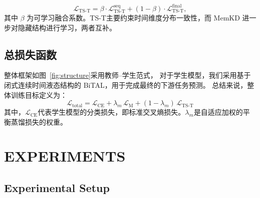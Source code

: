 \documentclass[a4paper, 12pt]{article}
\begin{document}
\begin{equation}
\mathcal{L}_{\text{TS-T}}
=
\beta \cdot \mathcal{L}_{\text{TS-T}}^{\text{seq}}
+
(1 - \beta)\cdot
\mathcal{L}_{\text{TS-T}}^{\text{final}},
\end{equation}
其中 $\beta$ 为可学习融合系数。TS-T主要约束时间维度分布一致性，而 MemKD 进一步对隐藏结构进行学习，两者互补。
\subsection{总损失函数}
\label{subsec:total_loss}

整体框架如图~\ref{fig:structure}采用教师–学生范式，
对于学生模型，我们采用基于闭式连续时间液态结构的 BiTAL，用于完成最终的下游任务预测。
总结来说，整体训练目标定义为：
\begin{equation}
\mathcal{L}_{\text{total}} = \mathcal{L}_{\text{CE}} + \lambda_m \, \mathcal{L}_{\text{M}} + (1 - \lambda_m) \, \mathcal{L}_{\text{TS-T}}
\end{equation}
其中，$\mathcal{L}_{\text{CE}}$代表学生模型的分类损失，即标准交叉熵损失。$\lambda_m$是自适应加权的平衡蒸馏损失的权重。

\section{EXPERIMENTS}
\subsection{Experimental Setup}
\end{document}
